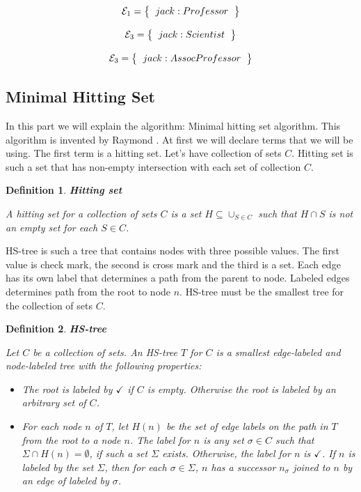 \documentclass[12pt,a4paper]{article}
\newtheorem{definition}{Definition}[subsection]
\begin{document}
\[ 
\mathcal{E}_{1} = \left\{
\begin{tabular}{c c}
	$jack : Professor$ \\
\end{tabular}
\right \}
\]

\[ 
\mathcal{E}_{3} = \left\{
\begin{tabular}{c c}
	$jack : Scientist$ \\
\end{tabular}
\right \}
\]

\[ 
\mathcal{E}_{3} = \left\{
\begin{tabular}{c c}
	$jack : AssocProfessor$ \\
\end{tabular}
\right \}
\]

\subsection{Minimal Hitting Set}
In this part we will explain the algorithm: Minimal hitting set algorithm. This algorithm is invented by Raymond \cite{reiterHS}. At first we will declare terms that we will be using. The first term is a hitting set. Let's have collection of sets $C$. Hitting set is such a set that has non-empty intersection with each set of collection $C$.

\begin{definition}{\textbf{Hitting set}}
	
	A hitting set for a collection of sets $C$ is a set $H \subseteq \cup_{S \in C}$ such that $H \cap S$ is not an empty set for each $S \in C$.
\end{definition}

HS-tree is such a tree that contains nodes with three possible values. The first value is check mark, the second is cross mark and the third is a set. Each edge has its own label that determines a path from the parent to node. Labeled edges determines path from the root to node $n$. HS-tree must be the smallest tree for the collection of sets $C$.

\begin{definition}{\textbf{HS-tree}}
	
	Let $C$ be a collection of sets. An HS-tree $T$ for $C$ is a smallest edge-labeled and node-labeled tree with the following properties:
	
	\begin{itemize}
		\item The root is labeled by $\checkmark$ if $C$ is empty. Otherwise the root is labeled by an arbitrary set of $C$.
		
		\item For each node $n$ of $T$, let $H(n)$ be the set of edge labels on the path in $T$ from the root to a node $n$. The label for $n$ is any set $\sigma \in C$ such that $\Sigma \cap H(n) = \emptyset$, if such a set $\Sigma$ exists. Otherwise, the label for $n$ is $\checkmark$. If $n$ is labeled by the set $\Sigma$, then for each $\sigma \in \Sigma$, $n$ has a successor $n_{\sigma}$ joined to $n$ by an edge of labeled by $\sigma$.
	\end{itemize}
\end{definition}
\end{document}
